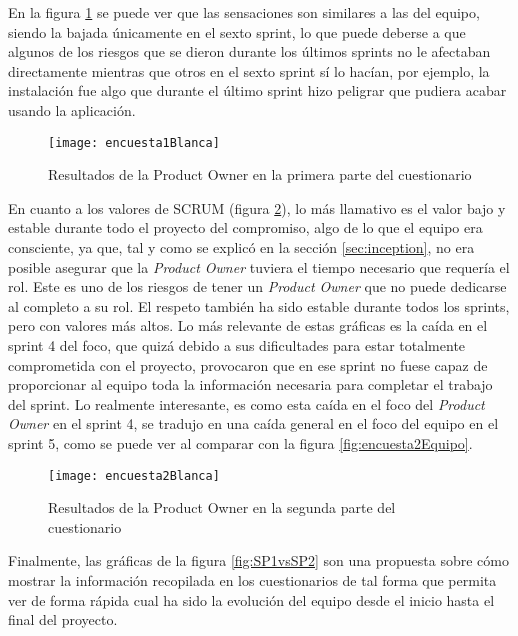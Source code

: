 En la figura \ref{fig:encuesta1Blancaw} se puede ver que las sensaciones son similares a las del equipo, siendo la bajada únicamente en el sexto sprint, lo que puede deberse a que algunos de los riesgos que se dieron durante los últimos sprints no le afectaban directamente mientras que otros en el sexto sprint sí lo hacían, por ejemplo, la instalación fue algo que durante el último sprint hizo peligrar que pudiera acabar usando la aplicación.

\begin{figure}[!h]
\begin{center}
\texttt{[image: encuesta1Blanca]}
\caption{Resultados de la Product Owner en la primera parte del cuestionario}
\label{fig:encuesta1Blancaw}
\end{center}
\end{figure}

En cuanto a los valores de SCRUM (figura \ref{fig:encuesta2Blanca}), lo más llamativo es el valor bajo y estable durante todo el proyecto del compromiso, algo de lo que el equipo era consciente, ya que, tal y como se explicó en la sección \ref{sec:inception}, no era posible asegurar que la \emph{Product Owner} tuviera el tiempo necesario que requería el rol. Este es uno de los riesgos de tener un \emph{Product Owner} que no puede dedicarse al completo a su rol. El respeto también ha sido estable durante todos los sprints, pero con valores más altos.
\clearpage
Lo más relevante de estas gráficas es la caída en el sprint 4 del foco, que quizá debido a sus dificultades para estar totalmente comprometida con el proyecto, provocaron que en ese sprint no fuese capaz de proporcionar al equipo toda la información necesaria para completar el trabajo del sprint. Lo realmente interesante, es como esta caída en el foco del \emph{Product Owner} en el sprint 4, se tradujo en una caída general en el foco del equipo en el sprint 5, como se puede ver al comparar con la figura \ref{fig:encuesta2Equipo}.

\begin{figure}[!h]
\begin{center}
\texttt{[image: encuesta2Blanca]}
\caption{Resultados de la Product Owner en la segunda parte del cuestionario}
\label{fig:encuesta2Blanca}
\end{center}
\end{figure}

Finalmente, las gráficas de la figura \ref{fig:SP1vsSP2} son una propuesta sobre cómo mostrar la información recopilada en los cuestionarios de tal forma que permita ver de forma rápida cual ha sido la evolución del equipo desde el inicio hasta el final del proyecto.

